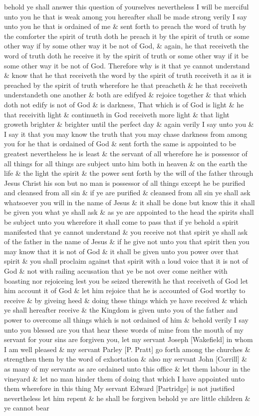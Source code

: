 				behold ye shall answer this question of yourselves nevertheless I will be merciful unto you he that is weak among you hereafter shall be made strong verily I say unto you he that is ordained of me \& sent forth to preach the word of truth by the comforter the spirit of truth doth he preach it by the spirit of truth or some other way if by some other way it be not of God, \& again, he that receiveth the word of truth doth he receive it by the spirit of truth or some other way if it be some other way it be not of God. Therefore why is it that ye cannot understand \& know that he that receiveth the word by the spirit of truth receiveth it as it is preached by the spirit of truth wherefore he that preacheth \& he that receiveth understandeth one another \& both are edifyed \& rejoice together \& that which doth not edify is not of God \& is darkness, That which is of God is light \& he that receivith light \& continueth in God receiveth more light \& that light groweth brighter \& brighter until the perfect day \& again verily I say unto you \& I say it that you may know the truth that you may chase darkness from among you for he that is ordained of God \& sent forth the same is appointed to be greatest nevertheless he is least \& the servant of all wherefore he is possessor of all things for all things are subject unto him both in heaven \& on the earth the life \& the light the spirit \& the power sent forth by the will of the father through Jesus Christ his son but no man is possessor of all things except he be purified and cleansed from all sin \& if ye are purified \& cleansed from all sin ye shall ask whatsoever you will in the name of Jesus \& it shall be done but know this it shall be given you what ye shall ask \& as ye are appointed to the head the spirits shall be subject unto you wherefore it shall come to pass that if ye behold a spirit manifested that ye cannot understand \& you receive not that spirit ye shall ask of the father in the name of Jesus \& if he give not unto you that spirit then you may know that it is not of God \& it shall be given unto you power over that spirit \& you shall proclaim against that spirit with a loud voice that it is not of God \& not with railing accusation that ye be not over come neither with boasting nor rejoiceing lest you be seized therewith he that receiveth of God let him account it of God \& let him rejoice that he is accounted of God worthy to receive \& by giveing heed \& doing these things which ye have received \& which ye shall hereafter receive \& the Kingdom is given unto you of the father and power to overcome all things which is not ordained of him \& behold verily I say unto you blessed are you that hear these words of mine from the mouth of my servant for your sins are forgiven you, let my servant Joseph [Wakefield] in whom I am well pleased \& my servant Parley [P. Pratt] go forth among the churches \& strengthen them by the word of exhortation \& also my servant John [Corrill] \& as many of my servants as are ordained unto this office \& let them labour in the vineyard \& let no man hinder them of doing that which I have appointed unto them wherefore in this thing My servant Edward [Partridge] is not justified nevertheless let him repent \& he shall be forgiven behold ye are little children \& ye cannot bear 